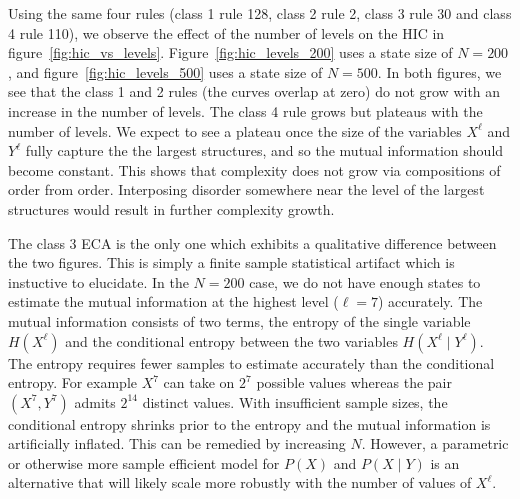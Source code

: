 Using the same four rules (class 1 rule 128, class 2 rule 2, class 3 rule 30
and class 4 rule 110), we observe the effect of the number of levels on the HIC
in figure~\ref{fig:hic_vs_levels}. Figure~\ref{fig:hic_levels_200} uses a state
size of $N\!=\!200$, and figure~\ref{fig:hic_levels_500} uses a state size of
$N\!=\!500$. In both figures, we see that the class 1 and 2 rules (the curves
overlap at zero) do not grow with an increase in the number of levels. The
class 4 rule grows but plateaus with the number of levels. We expect to see a
plateau once the size of the variables $X^\ell$ and $Y^\ell$ fully capture the
the largest structures, and so the mutual information should become constant.
This shows that complexity does not grow via compositions of order from order.
Interposing disorder somewhere near the level of the largest structures would
result in further complexity growth.

The class 3 ECA is the only one which exhibits a qualitative difference between
the two figures. This is simply a finite sample statistical artifact which is
instuctive to elucidate. In the $N\!=\!200$ case, we do not have enough states to
estimate the mutual information at the highest level ($\ell\!=\!7$) accurately.
The mutual information consists of two terms, the entropy of the single
variable $H(X^\ell)$ and the conditional entropy between the two variables
$H(X^\ell \mid Y^\ell)$. The entropy requires fewer samples to estimate
accurately than the conditional entropy. For example $X^7$ can take on $2^7$
possible values whereas the pair $(X^7, Y^7)$ admits $2^{14}$ distinct values.
With insufficient sample sizes, the conditional entropy shrinks prior to the
entropy and the mutual information is artificially inflated. This can be
remedied by increasing $N$. However, a parametric or otherwise more sample
efficient model for $P(X)$ and $P(X \mid Y)$ is an alternative that will likely
scale more robustly with the number of values of $X^\ell$.
